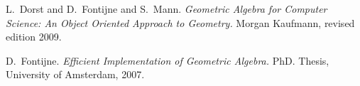 \documentclass[10pt, a4paper]{article}
\begin{document}
\iffalse
\section{Why did you write Gaigen 2.5 in C\#?}

I wrote Gaigen 2.5 in C\# because I wanted to try out the .Net platform
(it's pretty nice).
I assumed that Mono would be good enough to run Gaigen 2.5 on OS X and
Linux, but it is slightly disappointing in speed. Hopefully the Mono
team will improve Mono's performance in the future.
\fi



\begin{thebibliography}{}


	
 L.~Dorst and D.~Fontijne and S.~Mann.
	\emph{Geometric Algebra for Computer Science: An Object Oriented Approach to Geometry.}
	Morgan Kaufmann, revised edition 2009.

 D.~Fontijne.
	\emph{Efficient Implementation of Geometric Algebra.}
	PhD. Thesis, University of Amsterdam, 2007.


\end{thebibliography}
\end{document}
